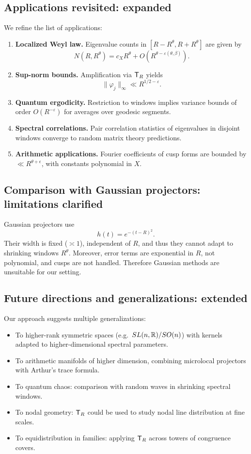 \subsection{Applications revisited: expanded}\label{subsec:proj-applications-detail}

We refine the list of applications:
\begin{enumerate}
\item \textbf{Localized Weyl law.} Eigenvalue counts in $[R-R^\theta,R+R^\theta]$ are given by
\[
N(R,R^\theta) = c_X R^\theta + O(R^{\theta-\varepsilon(\theta,\beta)}).
\]
\item \textbf{Sup-norm bounds.} Amplification via $\mathsf{T}_R$ yields
\[
\|\varphi_j\|_\infty \ll R^{1/2-\varepsilon}.
\]
\item \textbf{Quantum ergodicity.} Restriction to windows implies variance bounds of order $O(R^{-\varepsilon})$ for averages over geodesic segments.
\item \textbf{Spectral correlations.} Pair correlation statistics of eigenvalues in disjoint windows converge to random matrix theory predictions.
\item \textbf{Arithmetic applications.} Fourier coefficients of cusp forms are bounded by $\ll R^{\theta+\epsilon}$, with constants polynomial in $X$.
\end{enumerate}

\subsection{Comparison with Gaussian projectors: limitations clarified}\label{subsec:proj-gaussian}

Gaussian projectors use
\[
h(t)=e^{-(t-R)^2}.
\]
Their width is fixed ($\asymp 1$), independent of $R$, and thus they cannot adapt to shrinking windows $R^\theta$. Moreover, error terms are exponential in $R$, not polynomial, and cusps are not handled. Therefore Gaussian methods are unsuitable for our setting.

\subsection{Future directions and generalizations: extended}\label{subsec:proj-future}

Our approach suggests multiple generalizations:
\begin{itemize}
\item To higher-rank symmetric spaces (e.g.\ $SL(n,\mathbb{R})/SO(n)$) with kernels adapted to higher-dimensional spectral parameters.
\item To arithmetic manifolds of higher dimension, combining microlocal projectors with Arthur’s trace formula.
\item To quantum chaos: comparison with random waves in shrinking spectral windows.
\item To nodal geometry: $\mathsf{T}_R$ could be used to study nodal line distribution at fine scales.
\item To equidistribution in families: applying $\mathsf{T}_R$ across towers of congruence covers.
\end{itemize}

